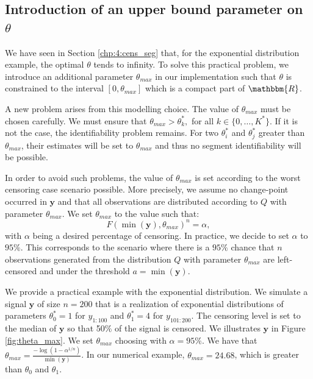 \subsection{Introduction of an upper bound parameter on $\theta$}

We have seen in Section \ref{chp:4:cens_seg} that, for the exponential distribution example, the optimal $\theta$ tends to infinity. To solve this practical problem, we introduce an additional parameter $\theta_{max}$ in our implementation such that $\theta$ is constrained to the interval $[0,\theta_{max}]$ which is a compact part of $\mathbbm{R}$. 

A new problem arises from this modelling choice. The value of $\theta_{max}$ must be chosen carefully. We must ensure that $\theta_{max}> \theta^*_k,$ for all $k \in \{0,\dots,K^*\}$. If it is not the case, the identifiability problem remains. For two $\theta^*_i$ and $\theta^*_j$  greater than $\theta_{max}$, their estimates will be set to $\theta_{max}$ and thus no segment identifiability will be possible. 

In order to avoid such problems, the value of $\theta_{max}$ is set according to the worst censoring case scenario possible. More precisely, we assume no change-point occurred in $\bm y$ and that all observations are distributed according to $Q$ with parameter $\theta_{max}$. We set $\theta_{max}$ to the value such that: 
\begin{equation}\label{chp:4:thetamax}
F(\min(\bm y),\theta_{max})^n = \alpha,
\end{equation}
with $\alpha$ being a desired percentage of censoring. In practice, we decide to set $\alpha$ to $95\%$. This corresponds to the scenario where there is a $95\%$ chance that $n$ observations generated from the distribution $Q$ with parameter $\theta_{max}$ are left-censored and under the threshold $a = \min(\bm y)$. 

We provide a practical example with the exponential distribution. We simulate a signal $\bm y$ of size $n = 200$ that is a realization of exponential distributions of parameters $\theta^*_0 = 1$ for $y_{1:100}$ and $\theta^*_1 = 4$ for $y_{101:200}$. The censoring level is set to the median of $\bm y$ so that 50$\%$ of the signal is censored. We illustrates $\bm y$ in Figure \ref{fig:theta_max}. We set $\theta_{max}$ choosing with $\alpha = 95\%$. We have that $\theta_{max} = \frac{-\log(1-\alpha^{1/n})}{\min(\bm y)}$. In our numerical example, $\theta_{max} = 24.68$, which is greater than $\theta_0$ and $\theta_1$.

